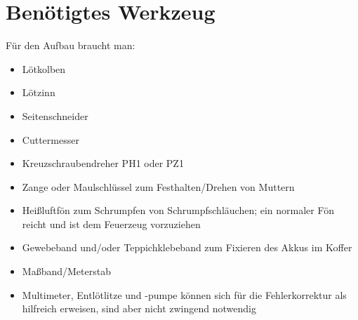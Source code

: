 \documentclass[paper=a4, open=any, numbers=noenddot]{scrbook}
\begin{document}
		\section{Benötigtes Werkzeug}
			Für den Aufbau braucht man:
			\begin{itemize}
				\item Lötkolben
				\item Lötzinn
				\item Seitenschneider
				\item Cuttermesser
				\item Kreuzschraubendreher PH1 oder PZ1
				\item Zange oder Maulschlüssel zum Festhalten/Drehen von Muttern
				\item Heißluftfön zum Schrumpfen von Schrumpfschläuchen; ein normaler Fön reicht und ist dem Feuerzeug vorzuziehen
				\item Gewebeband und/oder Teppichklebeband zum Fixieren des Akkus im Koffer
				\item Maßband/Meterstab
				\item Multimeter, Entlötlitze und -pumpe können sich für die Fehlerkorrektur als hilfreich erweisen, sind aber nicht zwingend notwendig
			\end{itemize}
\end{document}
